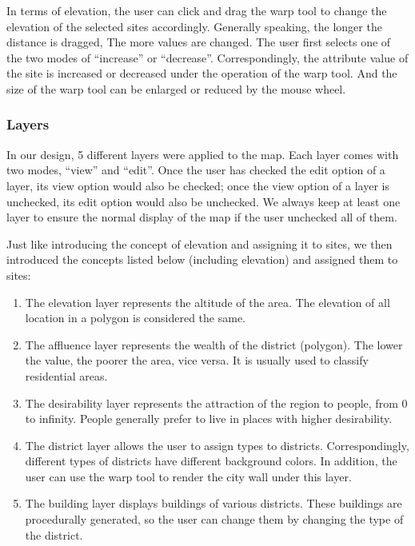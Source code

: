 In terms of elevation, the user can click and drag the warp tool to change the elevation of the selected sites accordingly. Generally speaking, the longer the distance is dragged, The more values are changed. The user first selects one of the two modes of ``increase'' or ``decrease''. Correspondingly, the attribute value of the site is increased or decreased under the operation of the warp tool. And the size of the warp tool can be enlarged or reduced by the mouse wheel.

\subsubsection{Layers}
In our design, 5 different layers were applied to the map. Each layer comes with two modes, ``view'' and ``edit''. Once the user has checked the edit option of a layer, its view option would also be checked; once the view option of a layer is unchecked, its edit option would also be unchecked. We always keep at least one layer to ensure the normal display of the map if the user unchecked all of them.

Just like introducing the concept of elevation and assigning it to sites, we then introduced the concepts listed below (including elevation) and assigned them to sites:

\begin{enumerate}
  \item The elevation layer represents the altitude of the area. The elevation of all location in a polygon is considered the same.
  \item The affluence layer represents the wealth of the district (polygon). The lower the value, the poorer the area, vice versa. It is usually used to classify residential areas.
  \item The desirability layer represents the attraction of the region to people, from 0 to infinity. People generally prefer to live in places with higher desirability.
  \item The district layer allows the user to assign types to districts. Correspondingly, different types of districts have different background colors. In addition, the user can use the warp tool to render the city wall under this layer.
  \item The building layer displays buildings of various districts. These buildings are procedurally generated, so the user can change them by changing the type of the district.
\end{enumerate}

